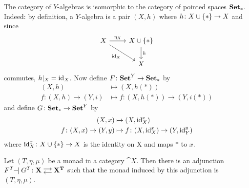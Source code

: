 \begin{example}
    The category of $Y$-algebras is isomorphic to the category of pointed spaces $\mathbf{Set_{\ast}}$.
    Indeed: by definition, a $Y$-algebra is a pair $(X,h)$ where $h \colon X \cup \{\ast\} \to X$
    and since 
    \[
     \begin{tikzcd}
         X \ar[r,"\eta_X"] \ar[rd,"\id_X"']
         & X \cup \pt \ar[d,"h"] \\
         & X 
     \end{tikzcd}
    \]
    commutes, $h\arrowvert_X = \operatorname{id}_X$. Now define $F \colon \mathbf{Set}^Y \to \mathbf{Set_{\ast}}$ by 
    \begin{align*}
        (X,h) &\mapsto (X,h(\ast)) \\
        f \colon (X,h) \to (Y,i) &\mapsto f \colon (X,h(\ast)) \to (Y,i(\ast))
    \end{align*}
    and define $G \colon \mathbf{Set_{\ast}} \to \mathbf{Set}^Y$ by 
    \begin{align*}
        (X,x) &\mapsto (X, \operatorname{id}_{X}^x) \\
        f \colon (X,x) \to (Y,y) &\mapsto f \colon (X,\operatorname{id}_{X}^x) \to (Y,\operatorname{id}_Y^y)
    \end{align*}
    where $\operatorname{id}_X^x \colon X \cup \{\ast\} \to X$ is the identity on X and maps $\ast$ to $x$.
\end{example}
\begin{theorem}
    Let $(T,\eta,\mu)$ be a monad in a category $\cat{X}$.
    Then there is an adjunction $F^T \! \! \adj G^T \colon \adjar{X}{X^T}$
    such that the monad induced by this adjunction is $(T,\eta,\mu)$.
\end{theorem}
